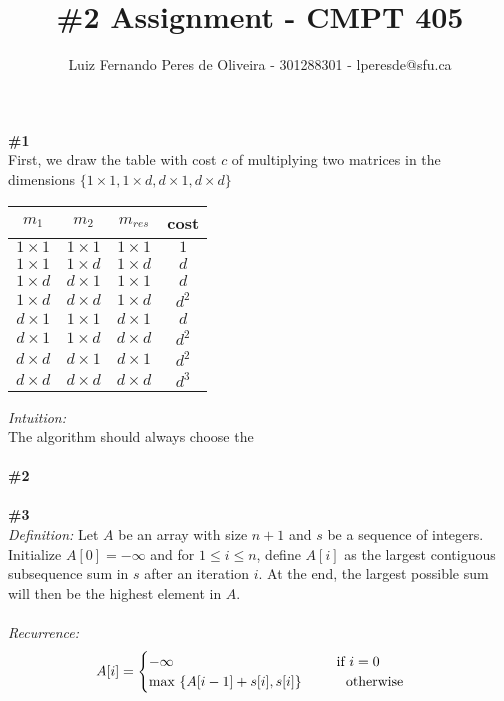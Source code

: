 \documentclass{article}
\title{\#2 Assignment - CMPT 405}
\author{Luiz Fernando Peres de Oliveira - 301288301 - lperesde@sfu.ca}
\newcommand\tab[1][1cm]{\hspace*{#1}}
\begin{document}
\maketitle
\textbf{\#1}
\\
First, we draw the table with cost $c$ of multiplying two matrices in the dimensions $\{ 1 \times 1, 1 \times d, d \times 1, d \times d\}$
\\
\begin{center}
\begin{tabular}{ |c|c|c|c| } 
 \hline
 $m_1$ & $m_2$ & $m_{res}$ & cost \\
 \hline
 $1 \times 1$ & $1 \times 1$ & $1 \times 1$ & $1$ \\
 \hline
 $1 \times 1$ & $1 \times d$ & $1 \times d$ & $d$ \\
 \hline
 $1 \times d$ & $d \times 1$ & $1 \times 1$ & $d$ \\
 \hline
 $1 \times d$ & $d \times d$ & $1 \times d$ & $d^2$ \\
 \hline
 $d \times 1$ & $1 \times 1$ & $d \times 1$ & $d$ \\
 \hline
 $d \times 1$ & $1 \times d$ & $d \times d$ & $d^2$ \\
 \hline
 $d \times d$ & $d \times 1$ & $d \times 1$ & $d^2$ \\
 \hline
 $d \times d$ & $d \times d$ & $d \times d$ & $d^3$ \\
 \hline
\end{tabular}
\end{center}
\textit{Intuition:}
\\
The algorithm should always choose the 
\\
\\
\textbf{\#2}
\\
\\
\textbf{\#3}\\
\textit{Definition:} Let $A$ be an array with size $n+1$ and $s$ be a sequence of integers. Initialize $A[0] = - \infty$ and for $1 \leq i \leq n$, define $A[i]$ as the largest contiguous subsequence sum in $s$ after an iteration $i$.  At the end, the largest possible sum will then be the highest element in $A$.\\
\\
\textit{Recurrence:}
\begin{gather*}
A[i] =
\begin{cases}
-\infty \tab\tab\tab\tab\text{   } $if $i = 0 \\
\text{max } \{A[i-1] + s[i], s[i]\} \tab $ otherwise $
\end{cases}
\end{gather*}\\
\end{document}
